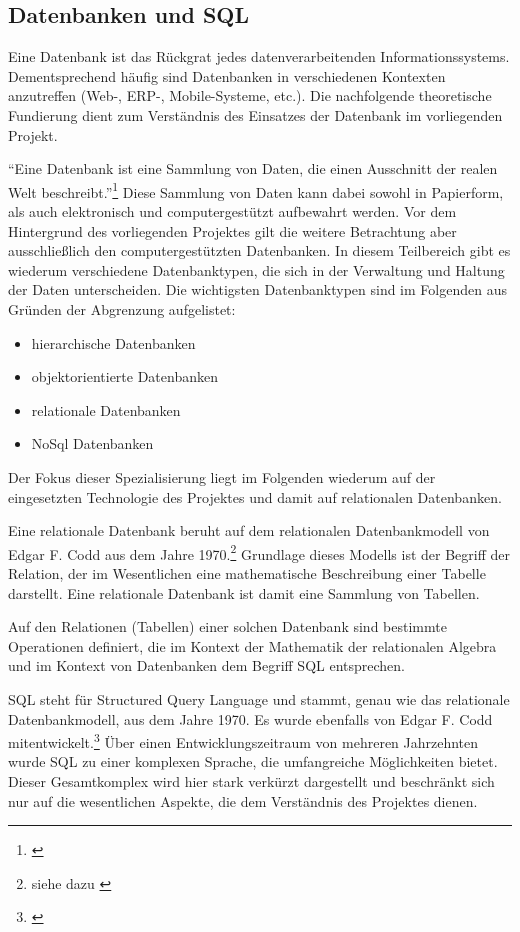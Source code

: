 \subsection{Datenbanken und SQL}
\label{sec:DatenbankenUndSql}

Eine Datenbank ist das Rückgrat jedes datenverarbeitenden Informationssystems. Dementsprechend häufig sind Datenbanken in 
verschiedenen Kontexten anzutreffen (Web-, ERP-, Mobile-Systeme, etc.). Die nachfolgende theoretische Fundierung dient zum 
Verständnis des Einsatzes der Datenbank im vorliegenden Projekt.

"`Eine Datenbank ist eine Sammlung von Daten, die einen Ausschnitt der realen Welt beschreibt."'\footnote{\citet{elmasri2009}}
Diese
Sammlung von Daten kann dabei sowohl in Papierform, als auch elektronisch und computergestützt aufbewahrt werden. Vor dem 
Hintergrund des vorliegenden Projektes gilt die weitere Betrachtung aber ausschließlich den computergestützten Datenbanken.
In diesem Teilbereich gibt es wiederum verschiedene Datenbanktypen, die sich in der Verwaltung und Haltung der Daten 
unterscheiden. Die wichtigsten Datenbanktypen sind im Folgenden aus Gründen der Abgrenzung aufgelistet:

\begin{itemize}
  \item hierarchische Datenbanken
  \item objektorientierte Datenbanken
  \item relationale Datenbanken
  \item NoSql Datenbanken
\end{itemize}

Der Fokus dieser Spezialisierung liegt im Folgenden wiederum auf der eingesetzten Technologie des Projektes und damit auf 
relationalen Datenbanken. 

Eine relationale Datenbank beruht auf dem relationalen Datenbankmodell von Edgar F. Codd aus dem Jahre 1970.\footnote{siehe dazu \citet{codd1970}} Grundlage dieses Modells ist der Begriff der Relation, der im Wesentlichen
eine mathematische Beschreibung einer Tabelle darstellt. Eine relationale Datenbank ist damit eine Sammlung von Tabellen.

Auf den Relationen (Tabellen) einer solchen Datenbank sind bestimmte Operationen definiert, die im Kontext der Mathematik 
der relationalen Algebra und im Kontext von Datenbanken dem Begriff SQL entsprechen.

SQL steht für Structured Query Language und stammt, genau wie das relationale Datenbankmodell, aus dem Jahre 1970. Es 
wurde ebenfalls von Edgar F. Codd mitentwickelt.\footnote{\citet{kline2005}} Über einen Entwicklungszeitraum von mehreren Jahrzehnten 
wurde SQL zu einer komplexen Sprache, die umfangreiche Möglichkeiten bietet. Dieser Gesamtkomplex wird hier stark verkürzt
dargestellt und beschränkt sich nur auf die wesentlichen Aspekte, die dem Verständnis des Projektes dienen.


